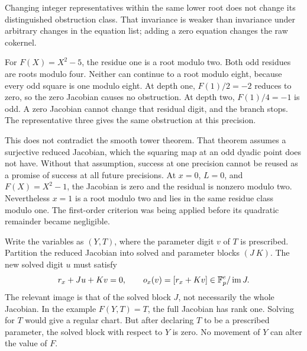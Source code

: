 Changing integer representatives within the same lower root does not change its distinguished obstruction class. That invariance is weaker than invariance under arbitrary changes in the equation list; adding a zero equation changes the raw cokernel.

For $F(X)=X^2-5$, the residue one is a root modulo two. Both odd residues are roots modulo four. Neither can continue to a root modulo eight, because every odd square is one modulo eight.
At depth one, $F(1)/2=-2$ reduces to zero, so the zero Jacobian causes no obstruction. At depth two, $F(1)/4=-1$ is odd. A zero Jacobian cannot change that residual digit, and the branch stops. The representative three gives the same obstruction at this precision.

This does not contradict the smooth tower theorem. That theorem assumes a surjective reduced Jacobian, which the squaring map at an odd dyadic point does not have. Without that assumption, success at one precision cannot be reused as a promise of success at all future precisions.
At $x=0$, $L=0$, and $F(X)=X^2-1$, the Jacobian is zero and the residual is nonzero modulo two. Nevertheless $x=1$ is a root modulo two and lies in the same residue class modulo one. The first-order criterion was being applied before its quadratic remainder became negligible.

Write the variables as $(Y,T)$, where the parameter digit $v$ of $T$ is prescribed. Partition the reduced Jacobian into solved and parameter blocks $(J\ K)$. The new solved digit $u$ must satisfy
\[
 r_x+Ju+Kv=0,\qquad o_x(v)=[r_x+Kv]\in\mathbb F_p^e/\operatorname{im} J.
\]
The relevant image is that of the solved block $J$, not necessarily the whole Jacobian.
In the example $F(Y,T)=T$, the full Jacobian has rank one. Solving for $T$ would give a regular chart. But after declaring $T$ to be a prescribed parameter, the solved block with respect to $Y$ is zero. No movement of $Y$ can alter the value of $F$.

